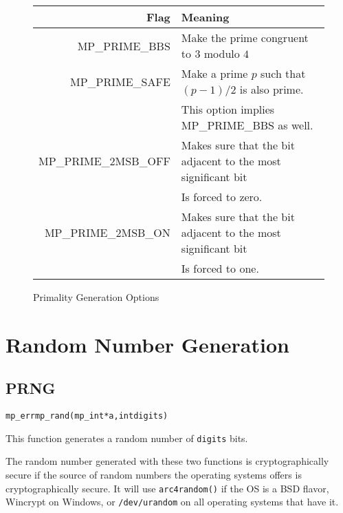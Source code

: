\documentclass[synpaper]{book}
\begin{document}
\begin{figure}[h]
  \begin{center}
    \begin{small}
      \begin{tabular}{|r|l|}
        \hline \textbf{Flag}        & \textbf{Meaning}
        \\
        \hline MP\_PRIME\_BBS       & Make the prime congruent to $3$ modulo $4$
        \\
        \hline MP\_PRIME\_SAFE      & Make a prime $p$ such that $(p - 1)/2$ is also prime.
        \\
                                    & This option implies MP\_PRIME\_BBS as well.
        \\
        \hline MP\_PRIME\_2MSB\_OFF & Makes sure that the bit adjacent to the most significant bit
        \\
                                    & Is forced to zero.
        \\
        \hline MP\_PRIME\_2MSB\_ON  & Makes sure that the bit adjacent to the most significant bit
        \\
                                    & Is forced to one.
        \\
        \hline
      \end{tabular}
    \end{small}
  \end{center}
  \caption{Primality Generation Options}
  \label{fig:primeopts}
\end{figure}

\chapter{Random Number Generation}
\section{PRNG}
\begin{alltt}
mp_err mp_rand(mp_int *a, int digits)
\end{alltt}
This function generates a random number of \texttt{digits} bits.

The random number generated with these two functions is cryptographically secure if the source of
random numbers the operating systems offers is cryptographically secure. It will use
\texttt{arc4random()} if the OS is a BSD flavor, Wincrypt on Windows, or \texttt{/dev/urandom} on
all operating systems that have it.
\end{document}
